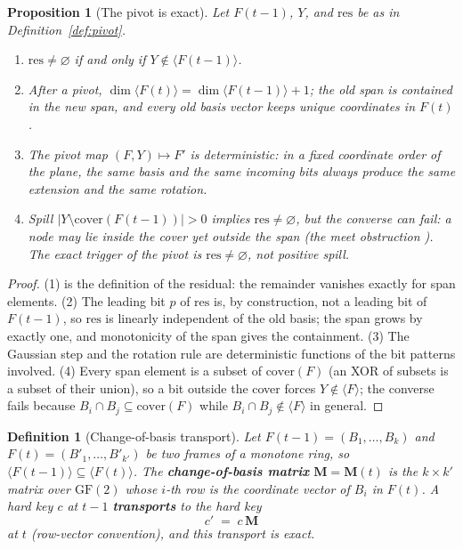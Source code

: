 \documentclass[11pt,a4paper]{article}
\newtheorem{definition}[principle]{Definition}
\newtheorem{proposition}[principle]{Proposition}
\theoremstyle{remark}
\newcommand{\res}{\ensuremath{\mathrm{res}}}             %
\newcommand{\spanof}[1]{\ensuremath{\langle #1\rangle}}  %
\newcommand{\cover}{\ensuremath{\mathrm{cover}}}         %
\newcommand{\Change}{\ensuremath{\mathbf{M}}}            %
\begin{document}
\begin{proposition}[The pivot is exact]
\label{prop:pivot}
Let $F(t{-}1)$, $Y$, and $\res$ be as in Definition~\ref{def:pivot}.
\begin{enumerate}[leftmargin=*,nosep]
  \item $\res \neq \varnothing$ if and only if $Y \notin \spanof{F(t{-}1)}$.
  \item After a pivot, $\dim \spanof{F(t)} = \dim \spanof{F(t{-}1)} + 1$; the
    old span is contained in the new span, and every old basis vector keeps
    unique coordinates in $F(t)$.
  \item The pivot map $(F, Y) \mapsto F'$ is deterministic: in a fixed
    coordinate order of the plane, the same basis and the same incoming bits
    always produce the same extension and the same rotation.
  \item Spill $|Y \setminus \cover(F(t{-}1))| > 0$ implies
    $\res \neq \varnothing$, but the converse can fail: a node may lie inside
    the cover yet outside the span (the meet obstruction
    \cite{state2026}). The exact trigger of the pivot is $\res \neq
    \varnothing$, not positive spill.
\end{enumerate}
\end{proposition}

\begin{proof}
(1) is the definition of the residual: the remainder vanishes exactly for
span elements. (2) The leading bit $p$ of $\res$ is, by construction, not a
leading bit of $F(t{-}1)$, so $\res$ is linearly independent of the old
basis; the span grows by exactly one, and monotonicity of the span gives the
containment. (3) The Gaussian step and the rotation rule are deterministic
functions of the bit patterns involved. (4) Every span element is a subset of
$\cover(F)$ (an XOR of subsets is a subset of their union), so a bit outside
the cover forces $Y \notin \spanof{F}$; the converse fails because
$B_i \cap B_j \subseteq \cover(F)$ while $B_i \cap B_j \notin \spanof{F}$ in
general.
\end{proof}

\begin{definition}[Change-of-basis transport]
\label{def:transport}
Let $F(t{-}1)=(B_1,\dots,B_k)$ and $F(t)=(B'_1,\dots,B'_{k'})$ be two frames
of a monotone ring, so $\spanof{F(t{-}1)} \subseteq \spanof{F(t)}$. The
\textbf{change-of-basis matrix} $\Change = \Change(t)$ is the
$k \times k'$ matrix over $\mathrm{GF}(2)$ whose $i$-th row is the coordinate
vector of $B_i$ in $F(t)$. A hard key $c$ at $t{-}1$ \textbf{transports} to
the hard key
\[
  c' \;=\; c \,\Change
\]
at $t$ (row-vector convention), and this transport is exact.
\end{definition}
\end{document}
